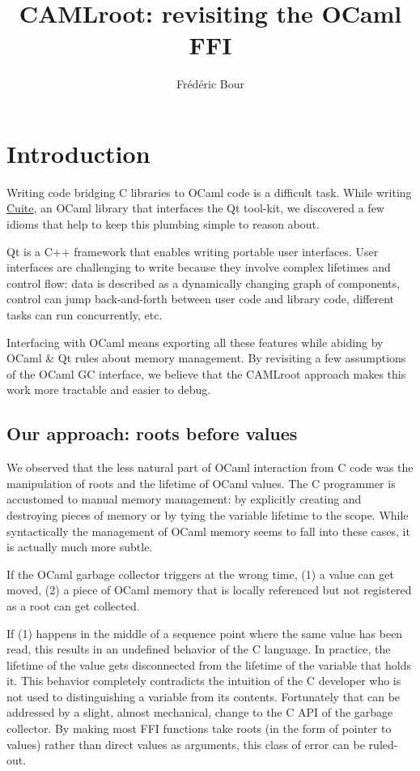 \documentclass[a4paper]{easychair}
\title{CAMLroot: revisiting the OCaml FFI}
\author{
  Frédéric Bour
}
\institute{
  Facebook --
  \email{def@fb.com}
}
\begin{document}
\maketitle

\section{Introduction}

Writing code bridging C libraries to OCaml code is a difficult task.
While writing \href{https://github.com/let-def/cuite}{Cuite}, an OCaml
library that interfaces the Qt tool-kit, we discovered a few idioms that
help to keep this plumbing simple to reason about.

Qt is a C++ framework that enables writing portable user interfaces.
User interfaces are challenging to write because they involve complex
lifetimes and control flow: data is described as a dynamically changing
graph of components, control can jump back-and-forth between user code
and library code, different tasks can run concurrently, etc.

Interfacing with OCaml means exporting all these features while abiding
by OCaml \& Qt rules about memory management. By revisiting a few
assumptions of the OCaml GC interface, we believe that the CAMLroot 
approach makes this work more tractable and easier to debug.

\subsection{Our approach: roots before values}

We observed that the less natural part of OCaml interaction from C code
was the manipulation of roots and the lifetime of OCaml values. The C
programmer is accustomed to manual memory management: by explicitly
creating and destroying pieces of memory or by tying the variable
lifetime to the scope. While syntactically the management of OCaml
memory seems to fall into these cases, it is actually much more subtle.

If the OCaml garbage collector triggers at the wrong time, (1) a value
can get moved, (2) a piece of OCaml memory that is locally referenced
but not registered as a root can get collected.

If (1) happens in the middle of a sequence point %
where the same value has been read, this results in an undefined behavior of
the C language. In practice, the lifetime of the value gets disconnected from
the lifetime of the variable that holds it.  This behavior completely
contradicts the intuition of the C developer who is not used to distinguishing
a variable from its contents.  Fortunately that can be addressed by a slight,
almost mechanical, change to the C API of the garbage collector. By making most
FFI functions take roots (in the form of pointer to values) rather than direct
values as arguments, this class of error can be ruled-out.
\end{document}
